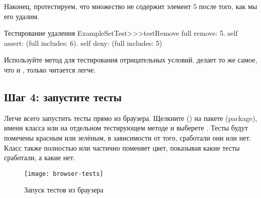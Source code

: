 \documentclass[a4paper,10pt,twoside]{book}
\begin{document}
Наконец, протестируем, что множество не содержит элемент 5 после того, как мы его удалим.

\begin{method}[testRemove]{Тестирование удаления}
ExampleSetTest>>>testRemove
	full remove: 5.
	self assert: (full includes: 6).
	self deny: (full includes: 5)
\end{method}

\noindent
Используйте метод  для тестирования отрицательных условий.
 делает то же самое, что и , только читается легче.
\subsection{Шаг 4: запустите тесты}

Легче всего запустить тесты прямо из браузера.
Щелкните (\actclick) на пакете (package), имени класса или на отдельном тестирующем методе
и выберете .
Тесты будут помечены красным или зелёным, в зависимости от того, сработали они или нет.
Класс также полностью или частично поменяет цвет, показывая какие тесты сработали, а какие нет.

\begin{figure}[tbh]
  \begin{center}
	\texttt{[image: browser-tests]}
	\caption{Запуск тестов \sunit из браузера}
  \end{center}
\end{figure}
\end{document}
